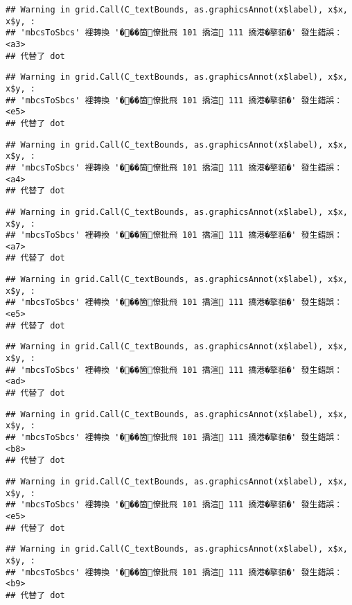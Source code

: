 \documentclass[
]{article}
\begin{document}
\begin{verbatim}
## Warning in grid.Call(C_textBounds, as.graphicsAnnot(x$label), x$x, x$y, :
## 'mbcsToSbcs' 裡轉換 '���箇憭批飛 101 撟渲 111 撟港�摮貊�' 發生錯誤：<a3>
## 代替了 dot
\end{verbatim}

\begin{verbatim}
## Warning in grid.Call(C_textBounds, as.graphicsAnnot(x$label), x$x, x$y, :
## 'mbcsToSbcs' 裡轉換 '���箇憭批飛 101 撟渲 111 撟港�摮貊�' 發生錯誤：<e5>
## 代替了 dot
\end{verbatim}

\begin{verbatim}
## Warning in grid.Call(C_textBounds, as.graphicsAnnot(x$label), x$x, x$y, :
## 'mbcsToSbcs' 裡轉換 '���箇憭批飛 101 撟渲 111 撟港�摮貊�' 發生錯誤：<a4>
## 代替了 dot
\end{verbatim}

\begin{verbatim}
## Warning in grid.Call(C_textBounds, as.graphicsAnnot(x$label), x$x, x$y, :
## 'mbcsToSbcs' 裡轉換 '���箇憭批飛 101 撟渲 111 撟港�摮貊�' 發生錯誤：<a7>
## 代替了 dot
\end{verbatim}

\begin{verbatim}
## Warning in grid.Call(C_textBounds, as.graphicsAnnot(x$label), x$x, x$y, :
## 'mbcsToSbcs' 裡轉換 '���箇憭批飛 101 撟渲 111 撟港�摮貊�' 發生錯誤：<e5>
## 代替了 dot
\end{verbatim}

\begin{verbatim}
## Warning in grid.Call(C_textBounds, as.graphicsAnnot(x$label), x$x, x$y, :
## 'mbcsToSbcs' 裡轉換 '���箇憭批飛 101 撟渲 111 撟港�摮貊�' 發生錯誤：<ad>
## 代替了 dot
\end{verbatim}

\begin{verbatim}
## Warning in grid.Call(C_textBounds, as.graphicsAnnot(x$label), x$x, x$y, :
## 'mbcsToSbcs' 裡轉換 '���箇憭批飛 101 撟渲 111 撟港�摮貊�' 發生錯誤：<b8>
## 代替了 dot
\end{verbatim}

\begin{verbatim}
## Warning in grid.Call(C_textBounds, as.graphicsAnnot(x$label), x$x, x$y, :
## 'mbcsToSbcs' 裡轉換 '���箇憭批飛 101 撟渲 111 撟港�摮貊�' 發生錯誤：<e5>
## 代替了 dot
\end{verbatim}

\begin{verbatim}
## Warning in grid.Call(C_textBounds, as.graphicsAnnot(x$label), x$x, x$y, :
## 'mbcsToSbcs' 裡轉換 '���箇憭批飛 101 撟渲 111 撟港�摮貊�' 發生錯誤：<b9>
## 代替了 dot
\end{verbatim}
\end{document}

